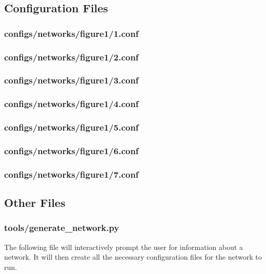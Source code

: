 \documentclass[11pt]{article} %
\begin{document}
\newpage
\subsection{Configuration Files}

\subsubsection{configs/networks/figure1/1.conf}


\subsubsection{configs/networks/figure1/2.conf}


\subsubsection{configs/networks/figure1/3.conf}


\subsubsection{configs/networks/figure1/4.conf}


\subsubsection{configs/networks/figure1/5.conf}


\subsubsection{configs/networks/figure1/6.conf}


\subsubsection{configs/networks/figure1/7.conf}


\newpage
\subsection{Other Files}

\subsubsection{tools/generate\_network.py}
The following file will interactively prompt the user for information about a network. It will then create all the necessary configuration files for the network to run.

\end{document}
